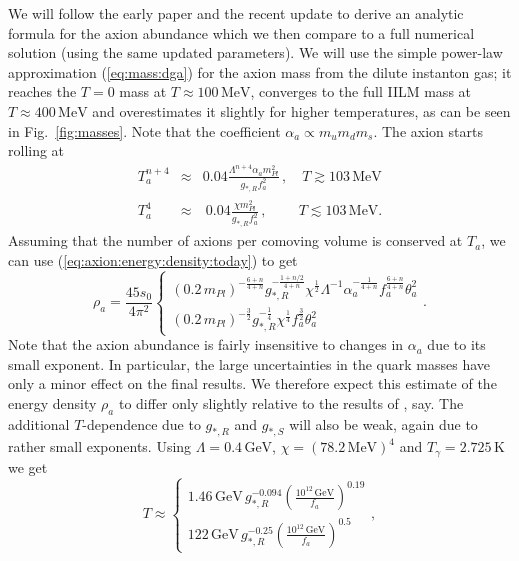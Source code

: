 \documentclass[preprint,nofootinbib]{revtex4}
\newcommand{\reffig}[1]{Fig.~\ref{#1}}
\newcommand{\units}[1]{\, \mathrm{#1}}
\begin{document}
We will follow the early paper \cite{turner:axion:cosmology} and the recent update \cite{bae:huh:kim:axion} to derive an analytic formula for the axion abundance which we then compare to a full numerical solution (using the same updated parameters).  We will use the simple power-law approximation (\ref{eq:mass:dga}) for the axion mass from  the dilute instanton gas; it reaches the $T=0$ mass at $T\approx 100 \units{MeV}$, converges to the full IILM mass at $T\approx 400 \units{MeV}$ and overestimates it slightly for higher temperatures, as 
can be seen in \reffig{fig:masses}. Note that the coefficient $\alpha_a \propto m_u m_d m_s$. The axion starts rolling at
\begin{eqnarray}
 T_a^{n+4} &\approx& 0.04 \frac{\Lambda^{n+4} \alpha_a m^2_{Pl}}{g_{*,R} f^2_a}\,, \quad T \gtrsim 103\units{MeV}\label{eq:T:oscillation:high}\\
 T_a^4~~ &\approx& ~0.04 \frac{\chi m^2_{Pl}}{g_{*,R} f^2_a} \,,~\qquad T \lesssim 103\units{MeV}.\label{eq:T:oscillation:low}
\end{eqnarray}
Assuming that the number of axions per comoving volume is conserved at $T_a$, we can use (\ref{eq:axion:energy:density:today}) to get
\begin{equation}
 \rho_a=\frac{45 s_0}{4\pi^2} \left\{
 \begin{array}{c}
  (0.2\,m_{Pl})^{-\frac{6+n}{4+n}} g_{*,R}^{-\frac{1+n/2}{4+n}} \chi^{\frac{1}{2}}  \Lambda^{-1} \alpha_a^{-\frac{1}{4+n}} f_a^{\frac{6+n}{4+n}} \theta_a^2\\
  (0.2\,m_{Pl})^{-\frac{3}{2}} g_{*,R}^{-\frac{1}{4}} \chi^{\frac{1}{4}} f_a^{\frac{3}{2}}  \theta_a^2
 \end{array}
 \right. .\label{eq:axion:energy:density}
\end{equation}
Note that the axion abundance is fairly insensitive to changes in $\alpha_a$ due to its small exponent. In particular, the large uncertainties in the quark masses have only a minor effect on the final results. We therefore expect this estimate of the energy density $\rho_a$ to differ only slightly relative to the results of \cite{bae:huh:kim:axion}, say. The additional $T$-dependence due to $g_{*,R}$ and $g_{*,S}$ will also be weak, again due to rather small exponents. Using $\Lambda=0.4\units{GeV}$, $\chi=(78.2\units{MeV})^4$ and $T_\gamma = 2.725 \units{K}$ we get 
\begin{equation}
 T \approx \left\{
 \begin{array}{c}
  1.46 \units{GeV}\, g_{*,R}^{-0.094} \left(\frac{10^{12}\units{GeV}}{f_a}\right)^{0.19} \\
  122 \units{GeV}\, g_{*,R}^{-0.25} \left(\frac{10^{12}\units{GeV}}{f_a}\right)^{0.5}
 \end{array}
 \right. ,
\end{equation}
\end{document}
